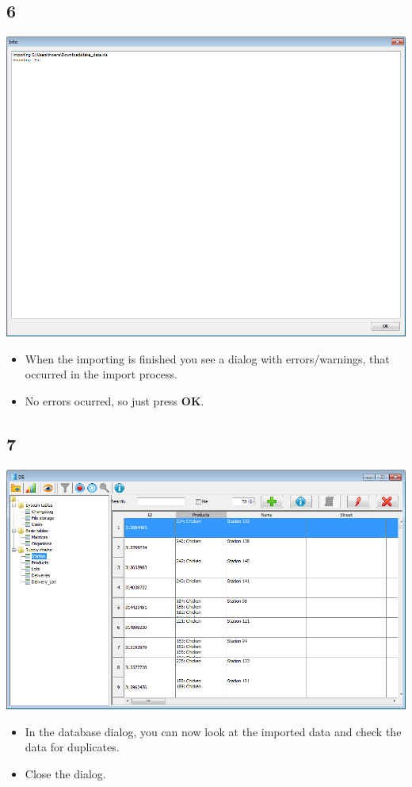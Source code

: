 \documentclass{beamer}
\begin{document}
\subsection{6}
\begin{frame}
	\begin{center}
  		\includegraphics[height=0.6\textheight]{6.png}
	\end{center}
	\begin{itemize}
		\item When the importing is finished you see a dialog with errors/warnings,  that occurred in the import process.
		\item No errors ocurred, so just press \textbf{OK}.
	\end{itemize}
\end{frame}

\subsection{7}
\begin{frame}
	\begin{center}
  		\includegraphics[height=0.6\textheight]{7.png}
	\end{center}
	\begin{itemize}
		\item In the database dialog, you can now look at the imported data and check the data for duplicates.
		\item Close the dialog.
	\end{itemize}
\end{frame}
\end{document}
